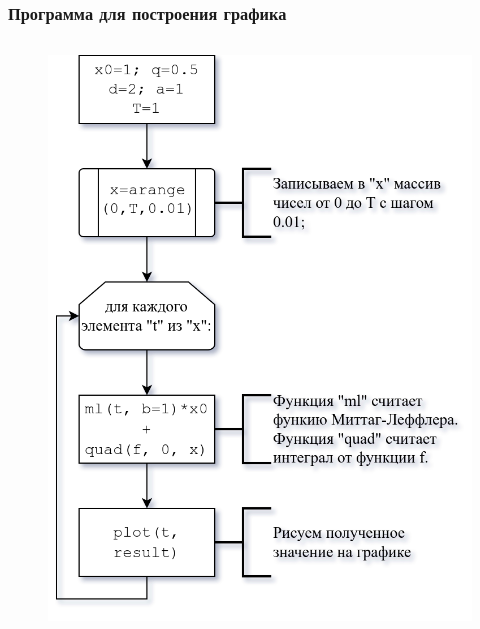 \documentclass{beamer}
\begin{document}
    \begin{frame}
        \frametitle{Программа для построения графика}
        \begin{columns}
 
            \begin{figure}
                \includegraphics[width=0.8\linewidth]{diagram}
            \end{figure}
             

\end{columns}
\end{frame}
\end{document}
